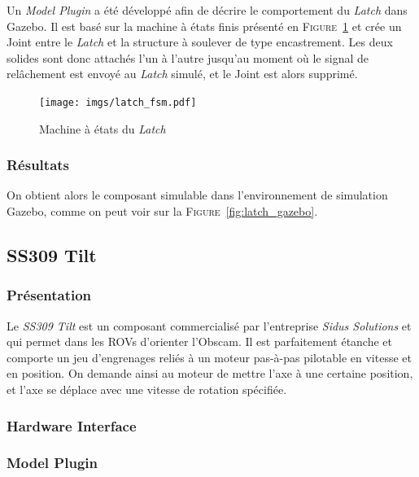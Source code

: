 				Un \textit{Model Plugin} a été développé afin de décrire le comportement du \textit{Latch} dans \gls{Gazebo}. Il est basé sur la machine à états finis présenté en \textsc{Figure}~\ref{fig:latch_fsm} et crée un \gls{Joint} entre le \textit{Latch} et la structure à soulever de type encastrement. Les deux solides sont donc attachés l'un à l'autre jusqu'au moment où le signal de relâchement est envoyé au \textit{Latch} simulé, et le \gls{Joint} est alors supprimé.

				\begin{figure}[!htb]
					\centering
					\texttt{[image: imgs/latch\_fsm.pdf]}
					\caption{Machine à états du \textit{Latch}}
					\label{fig:latch_fsm}
				\end{figure}

			\subsubsection{Résultats}

				On obtient alors le composant simulable dans l'environnement de simulation \gls{Gazebo}, comme on peut voir sur la \textsc{Figure}~\ref{fig:latch_gazebo}.

		\subsection{SS309 Tilt}

			\subsubsection{Présentation}

				Le \textit{SS309 Tilt} est un composant commercialisé par l'entreprise \textit{Sidus Solutions} et qui permet dans les \gls{ROV}s d'orienter l'\gls{Obscam}. Il est parfaitement étanche et comporte un jeu d'engrenages reliés à un moteur pas-à-pas pilotable en vitesse et en position. On demande ainsi au moteur de mettre l'axe à une certaine position, et l'axe se déplace avec une vitesse de rotation spécifiée.
			
			\subsubsection{Hardware Interface}

			\subsubsection{Model Plugin}

